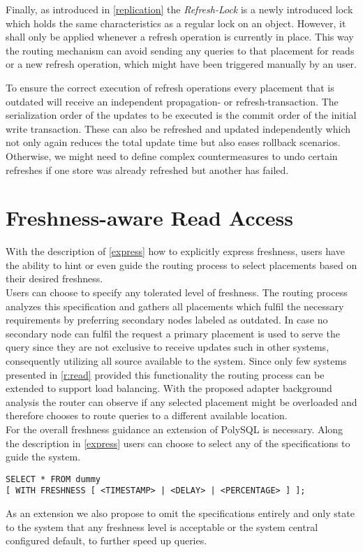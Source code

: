 Finally, as introduced in \ref{replication} the \emph{Refresh-Lock} is a newly introduced lock which holds the same characteristics as a regular lock on an object.
However, it shall only be applied whenever a refresh operation is currently in place. This way the routing mechanism can avoid sending any queries to that placement
for reads or a new refresh operation, which might have been triggered manually by an user.

To ensure the correct execution of refresh operations every placement that is outdated will receive an independent propagation- or refresh-transaction.
The serialization order of the updates to be executed is the commit order of the initial write transaction.
These can also be refreshed and updated independently which not only again reduces the total update time but also eases rollback scenarios.
Otherwise, we might need to define complex countermeasures to undo certain refreshes if one store was already refreshed but another has failed.




\section{ Freshness-aware Read Access }

With the description of \ref{express} how to explicitly express freshness, users have the ability to hint or even guide the routing process to select placements 
based on their desired freshness.\\
Users can choose to specify any tolerated level of freshness. The routing process analyzes this specification and gathers all placements which fulfil the necessary 
requirements by preferring secondary nodes labeled as outdated.
In case no secondary node can fulfil the request a primary placement is used to serve the query since they are not exclusive to receive updates such in other systems,
consequently utilizing all source available to the system.
Since only few systems presented in \ref{r:read} provided this functionality the routing process can be extended to support load balancing. 
With the proposed adapter background analysis the router can observe if any selected placement might be overloaded and therefore chooses to route 
queries to a different available location. \\



For the overall freshness guidance an extension of PolySQL is necessary.
Along the description in \ref{express} users can choose to select any of the specifications to guide the system.
\begin{verbatim}
SELECT * FROM dummy 
[ WITH FRESHNESS [ <TIMESTAMP> | <DELAY> | <PERCENTAGE> ] ];
\end{verbatim}
As an extension we also propose to omit the specifications entirely and only state to the system that any freshness level is acceptable or the system central
configured default, to further speed up queries.




